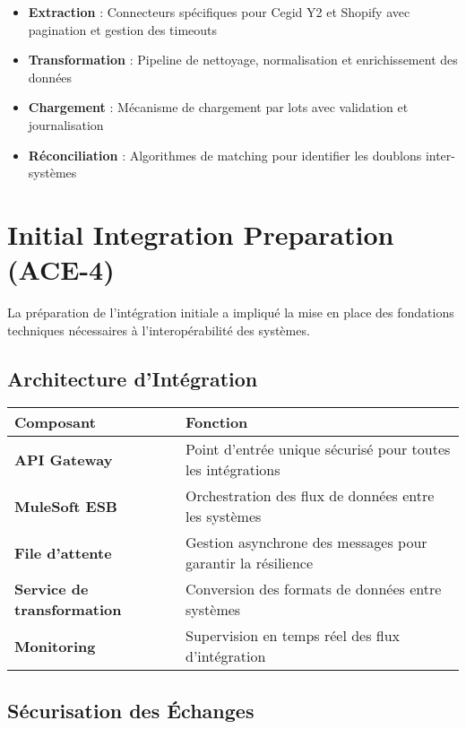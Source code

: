 \begin{itemize}
    \item \textbf{Extraction} : Connecteurs spécifiques pour Cegid Y2 et Shopify avec pagination et gestion des timeouts
    \item \textbf{Transformation} : Pipeline de nettoyage, normalisation et enrichissement des données
    \item \textbf{Chargement} : Mécanisme de chargement par lots avec validation et journalisation
    \item \textbf{Réconciliation} : Algorithmes de matching pour identifier les doublons inter-systèmes
\end{itemize}

\section{Initial Integration Preparation (ACE-4)}

La préparation de l'intégration initiale a impliqué la mise en place des fondations techniques nécessaires à l'interopérabilité des systèmes.

\subsection{Architecture d'Intégration}

\begin{center}
\begin{tabular}{|>{\bfseries}p{4cm}|p{9.5cm}|}
\hline
\rowcolor{lightblue} Composant & Fonction \\
\hline
API Gateway & Point d'entrée unique sécurisé pour toutes les intégrations \\
\hline
MuleSoft ESB & Orchestration des flux de données entre les systèmes \\
\hline
File d'attente & Gestion asynchrone des messages pour garantir la résilience \\
\hline
Service de transformation & Conversion des formats de données entre systèmes \\
\hline
Monitoring & Supervision en temps réel des flux d'intégration \\
\hline
\end{tabular}
\end{center}

\subsection{Sécurisation des Échanges}

